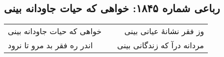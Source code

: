 \begin{center}
\section*{رباعی شماره ۱۸۴۵: خواهی که حیات جاودانه بینی}
\label{sec:1845}
\begin{longtable}{l p{0.5cm} r}
خواهی که حیات جاودانه بینی
&&
وز فقر نشانهٔ عیانی بینی
\\
اندر ره فقر بد مرو تا نرود
&&
مردانه درآ که زندگانی بینی
\\
\end{longtable}
\end{center}
